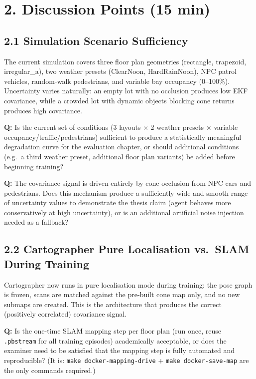 \documentclass[11pt,a4paper]{article}
\newcommand{\question}[1]{\textcolor{question}{\textbf{Q:}} #1}
\begin{document}
\section*{2. Discussion Points (15 min)}

\subsection*{2.1 Simulation Scenario Sufficiency}

The current simulation covers three floor plan geometries (rectangle, trapezoid,
irregular\_a), two weather presets (ClearNoon, HardRainNoon), NPC patrol vehicles,
random-walk pedestrians, and variable bay occupancy (0--100\%). Uncertainty varies
naturally: an empty lot with no occlusion produces low EKF covariance, while a
crowded lot with dynamic objects blocking cone returns produces high covariance.

\question{Is the current set of conditions (3 layouts $\times$ 2 weather presets
$\times$ variable occupancy/traffic/pedestrians) sufficient to produce a
statistically meaningful degradation curve for the evaluation chapter, or should
additional conditions (e.g.\ a third weather preset, additional floor plan variants)
be added before beginning training?}

\question{The covariance signal is driven entirely by cone occlusion from NPC cars
and pedestrians. Does this mechanism produce a sufficiently wide and smooth range
of uncertainty values to demonstrate the thesis claim (agent behaves more
conservatively at high uncertainty), or is an additional artificial noise injection
needed as a fallback?}

\bigskip
\subsection*{2.2 Cartographer Pure Localisation vs.\ SLAM During Training}

Cartographer now runs in pure localisation mode during training: the pose graph is
frozen, scans are matched against the pre-built cone map only, and no new submaps
are created. This is the architecture that produces the correct (positively
correlated) covariance signal.

\question{Is the one-time SLAM mapping step per floor plan (run once, reuse
\texttt{.pbstream} for all training episodes) academically acceptable, or does the
examiner need to be satisfied that the mapping step is fully automated and
reproducible? (It is: \texttt{make docker-mapping-drive} + \texttt{make docker-save-map}
are the only commands required.)}
\end{document}

